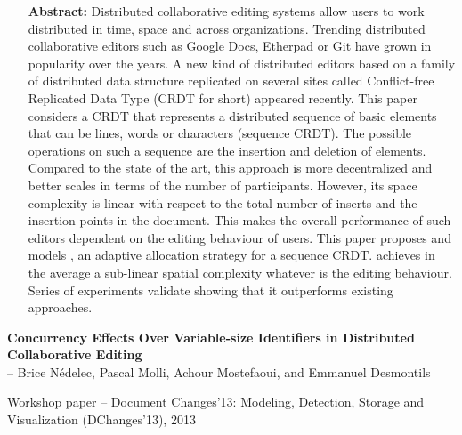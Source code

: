 \begin{itemize}
\item [\textbf{Abstract:}] {\small Distributed collaborative editing systems
    allow users to work distributed in time, space and across
    organizations. Trending distributed collaborative editors such as Google
    Docs, Etherpad or Git have grown in popularity over the years. A new kind of
    distributed editors based on a family of distributed data structure
    replicated on several sites called Conflict-free Replicated Data Type (CRDT
    for short) appeared recently. This paper considers a CRDT that represents a
    distributed sequence of basic elements that can be lines, words or
    characters (sequence CRDT). The possible operations on such a sequence are
    the insertion and deletion of elements. Compared to the state of the art,
    this approach is more decentralized and better scales in terms of the number
    of participants. However, its space complexity is linear with respect to the
    total number of inserts and the insertion points in the document. This makes
    the overall performance of such editors dependent on the editing behaviour
    of users. This paper proposes and models \LSEQ, an adaptive allocation
    strategy for a sequence CRDT. \LSEQ achieves in the average a sub-linear
    spatial complexity whatever is the editing behaviour. Series of experiments
    validate \LSEQ showing that it outperforms existing approaches.}
\end{itemize}

\noindent \textbf{Concurrency Effects Over Variable-size Identifiers in Distributed
Collaborative Editing}\\
\indent -- Brice Nédelec, Pascal Molli, Achour Mostefaoui, and Emmanuel Desmontils

\noindent Workshop paper -- Document Changes'13: Modeling, Detection, Storage and
Visualization (DChanges'13), 2013

